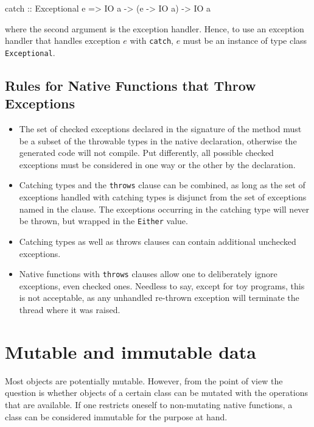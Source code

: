 \begin{code}
catch :: Exceptional e => IO a -> (e -> IO a) -> IO a
\end{code}

where the second argument is the exception handler. Hence, to use an exception handler that handles exception $e$ with \texttt{catch}, $e$ must be an instance of type class \texttt{Exceptional}.

\subsection*{Rules for Native Functions that Throw Exceptions}

\begin{itemize}
\item The set of checked exceptions declared in the signature of the \java{} method must be a subset of the throwable types in the native declaration, otherwise the generated \java{} code will not compile. Put differently, 
all possible checked exceptions must be considered in one way or the other by the \frege{} declaration.
\item Catching types and the \texttt{throws} clause can be combined, as long as the set of exceptions handled with catching types is disjunct from the set of exceptions named in the  clause. The exceptions occurring in the catching type will never be thrown, but wrapped in the \texttt{Either} value.
\item Catching types as well as throws clauses can contain additional unchecked exceptions.
\item Native functions with \texttt{throws} clauses allow one to deliberately ignore exceptions, even checked ones.
Needless to say, except for toy programs, this is not acceptable, as 
any unhandled re-thrown exception will terminate the thread where it was raised.
\end{itemize}

\section{Mutable and immutable \java{} data}

Most \java{} objects are potentially mutable. 
However, from the \frege{} point of view the question is whether objects of a certain class can be mutated with the operations that are available. If one restricts oneself to non-mutating native functions, 
a \java{} class can be considered immutable for the purpose at hand. 

